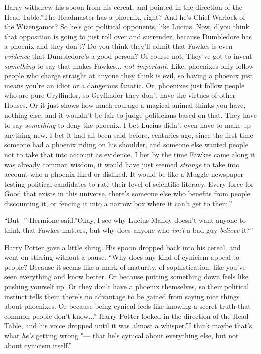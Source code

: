 Harry withdrew his spoon from his cereal, and pointed in the direction
of the Head Table.''The Headmaster has a phoenix, right? And he's Chief
Warlock of the Wizengamot? So he's got political opponents, like Lucius.
Now, d'you think that opposition is going to just roll over and
surrender, because Dumbledore has a phoenix and they don't? Do you think
they'll admit that Fawkes is even \emph{evidence} that Dumbledore's a
good person? Of course not. They've got to invent \emph{something} to
say that makes Fawkes... \emph{not important.} Like, phoenixes only
follow people who charge straight at anyone they think is evil, so
having a phoenix just means you're an idiot or a dangerous fanatic. Or,
phoenixes just follow people who are pure Gryffindor, so Gryffindor they
don't have the virtues of other Houses. Or it just shows how much
courage a magical animal thinks you have, nothing else, and it wouldn't
be fair to judge politicians based on that. They have to say
\emph{something} to deny the phoenix. I bet Lucius didn't even have to
make up anything new. I bet it had all been said before, centuries ago,
since the first time someone had a phoenix riding on his shoulder, and
someone else wanted people not to take that into account as evidence. I
bet by the time Fawkes came along it was already common wisdom, it would
have just seemed \emph{strange} to take into account who a phoenix liked
or disliked. It would be like a Muggle newspaper testing political
candidates to rate their level of scientific literacy. Every force for
Good that exists in this universe, there's someone else who benefits
from people discounting it, or fencing it into a narrow box where it
can't get to them.''

``But -'' Hermione said.''Okay, I see why Lucius Malfoy doesn't want
anyone to think that Fawkes matters, but why does anyone who
\emph{isn't} a bad guy \emph{believe} it?''

Harry Potter gave a little shrug. His spoon dropped back into his
cereal, and went on stirring without a pause. ``Why does any kind of
cynicism appeal to people? Because it seems like a mark of maturity, of
sophistication, like you've seen everything and know better. Or because
putting something down feels like pushing yourself up. Or they don't
have a phoenix themselves, so their political instinct tells them
there's no advantage to be gained from saying nice things about
phoenixes. Or because being cynical feels like knowing a secret truth
that common people don't know...'' Harry Potter looked in the
direction of the Head Table, and his voice dropped until it was almost a
whisper.''I think maybe that's what \emph{he's} getting wrong "--- that
he's cynical about everything else, but not about cynicism itself.''

